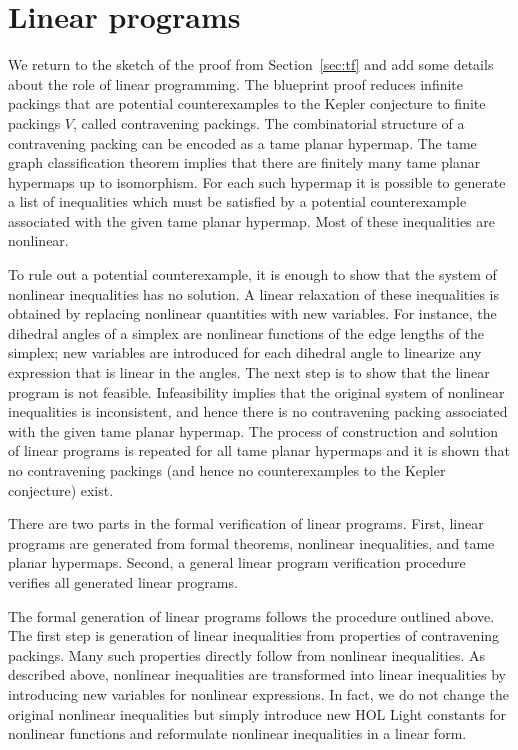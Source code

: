 \section{Linear programs}\label{sec:lp}

We return to the sketch of the proof from Section~\ref{sec:tf} and add
some details about the role of linear programming.  The blueprint
proof reduces infinite packings that are potential counterexamples to
the Kepler conjecture to finite packings $V$, called contravening
packings. The combinatorial structure of a contravening packing can be
encoded as a tame planar hypermap. The tame graph classification
theorem implies that there are finitely many tame planar hypermaps up
to isomorphism. For each such hypermap it is possible to generate a
list of inequalities which must be satisfied by a potential
counterexample associated with the given tame planar hypermap. Most of
these inequalities are nonlinear.

To rule out a potential counterexample, it is enough to show that the
system of nonlinear inequalities has no solution.  A linear relaxation
of these inequalities is obtained by replacing nonlinear quantities
with new variables. For instance, the dihedral angles of a simplex are
nonlinear functions of the edge lengths of the simplex; new variables
are introduced for each dihedral angle to linearize any expression that
is linear in the angles.  The next step is to show that
the linear program is not feasible. Infeasibility implies that the original
system of nonlinear inequalities is inconsistent, and hence there is
no contravening packing associated with the given tame planar
hypermap. The process of construction and solution of linear programs
is repeated for all tame planar hypermaps and it is shown that no
contravening packings (and hence no counterexamples to the Kepler
conjecture) exist.

There are two parts in the formal verification of linear
programs. First, linear programs are generated from formal theorems,
nonlinear inequalities, and tame planar hypermaps. Second, a general linear
program verification procedure verifies all generated linear programs.

The formal generation of linear programs follows the procedure
outlined above. The first step is generation of linear inequalities
from properties of contravening packings. Many such properties
directly follow from nonlinear inequalities. As described above,
nonlinear inequalities are transformed into linear inequalities by
introducing new variables for nonlinear expressions. In fact, we do
not change the original nonlinear inequalities but simply introduce
new HOL Light constants for nonlinear functions and reformulate
nonlinear inequalities in a linear form.

